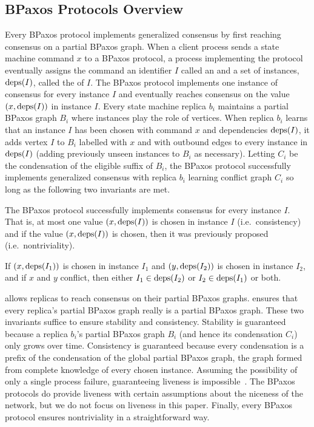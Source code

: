 \subsection{BPaxos Protocols Overview}
Every BPaxos protocol implements generalized consensus by first reaching
consensus on a partial BPaxos graph.
%
When a client process sends a state machine command $x$ to a BPaxos protocol, a
process implementing the protocol eventually assigns the command an identifier
$I$ called an  and a set of instances, $\text{deps}(I)$, called the
 of $I$.
%
The BPaxos protocol implements one instance of consensus for every instance $I$
and eventually reaches consensus on the value $(x, \text{deps}(I))$ in instance $I$.
Every state machine replica $b_i$ maintains a partial BPaxos graph $B_i$ where
instances play the role of vertices. When replica $b_i$ learns that an instance
$I$ has been chosen with command $x$ and dependencies $\text{deps}(I)$, it adds
vertex $I$ to $B_i$ labelled with $x$ and with outbound edges to every instance
in $\text{deps}(I)$ (adding previously unseen instances to $B_i$ as necessary).
Letting $C_i$ be the condensation of the eligible suffix of $B_i$, the BPaxos
protocol successfully implements generalized consensus with replica $b_i$
learning conflict graph $C_i$ so long as the following two invariants are met.

\begin{invariant}
  The BPaxos protocol successfully implements consensus for every instance $I$.
  That is, at most one value $(x, \text{deps}(I))$ is chosen in instance $I$ (i.e.\
  consistency) and if the value $(x, \text{deps}(I))$ is chosen, then it was
  previously proposed (i.e.\ nontriviality).
\end{invariant}
\begin{invariant}
  If $(x, \text{deps}(I_1))$ is chosen in instance $I_1$ and $(y, \text{deps}(I_2))$ is
  chosen in instance $I_2$, and if $x$ and $y$ conflict, then either $I_1 \in
  \text{deps}(I_2)$ or $I_2 \in \text{deps}(I_1)$ or both.
\end{invariant}

 allows replicas to reach consensus on their partial
BPaxos graphs. \invref{ConflictInvariant} ensures that every replica's partial
BPaxos graph really is a partial BPaxos graph.
%
These two invariants suffice to ensure stability and consistency. Stability is
guaranteed because a replica $b_i$'s partial BPaxos graph $B_i$ (and hence its
condensation $C_i$) only grows over time. Consistency is guaranteed because
every condensation is a prefix of the condensation of the global partial BPaxos
graph, the graph formed from complete knowledge of every chosen instance.
%
Assuming the possibility of only a single process failure, guaranteeing
liveness is impossible~\cite{fischer1982impossibility}. The BPaxos protocols do
provide liveness with certain assumptions about the niceness of the network,
but we do not focus on liveness in this paper. Finally, every BPaxos protocol
ensures nontriviality in a straightforward way.

